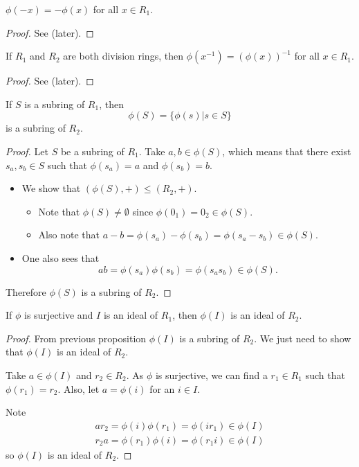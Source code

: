 \begin{proposition}
    $\phi(-x) = -\phi(x)$ for all $x \in R_1$.
\end{proposition}
\begin{proof}
    See  (later).
\end{proof}

\begin{proposition}\label{prop-inverse-under-ring-homomorphism}
    If $R_1$ and $R_2$ are both division rings, then $\phi(x^{-1}) = (\phi(x))^{-1}$ for all $x \in R_1$.
\end{proposition}
\begin{proof}
    See  (later).
\end{proof}

\begin{proposition}\label{prop-homomorphism-on-subring-is-subring}
    If $S$ is a subring of $R_1$, then
    \[
        \phi(S) = \{\phi(s) | s \in S\}
    \]
    is a subring of $R_2$.
\end{proposition}
\begin{proof}
    Let $S$ be a subring of $R_1$. Take $a, b \in \phi(S)$, which means that there exist $s_a, s_b\in S$ such that $\phi(s_a) = a$ and $\phi(s_b) = b$.
    \begin{itemize}
        \item We show that $(\phi(S), +) \leq (R_2, +)$.
        \begin{itemize}
            \item Note that $\phi(S) \neq \emptyset$ since $\phi(0_1) = 0_2 \in \phi(S)$.
            \item Also note that $a - b = \phi(s_a) - \phi(s_b) = \phi(s_a-s_b) \in \phi(S)$.
        \end{itemize}

        \item One also sees that
        \[
            ab = \phi(s_a)\phi(s_b) = \phi(s_as_b) \in \phi(S).
        \]
    \end{itemize}
    Therefore $\phi(S)$ is a subring of $R_2$.
\end{proof}

\begin{proposition}
    If $\phi$ is surjective and $I$ is an ideal of $R_1$, then $\phi(I)$ is an ideal of $R_2$.
\end{proposition}
\begin{proof}
    From previous proposition $\phi(I)$ is a subring of $R_2$. We just need to show that $\phi(I)$ is an ideal of $R_2$.

    Take $a \in \phi(I)$ and $r_2 \in R_2$. As $\phi$ is surjective, we can find a $r_1 \in R_1$ such that $\phi(r_1) = r_2$. Also, let $a = \phi(i)$ for an $i \in I$.

    Note
    \begin{align*}
        ar_2 = \phi(i)\phi(r_1) = \phi(ir_1) \in \phi(I)\\
        r_2a = \phi(r_1)\phi(i) = \phi(r_1i) \in \phi(I)
    \end{align*}
    so $\phi(I)$ is an ideal of $R_2$.
\end{proof}

